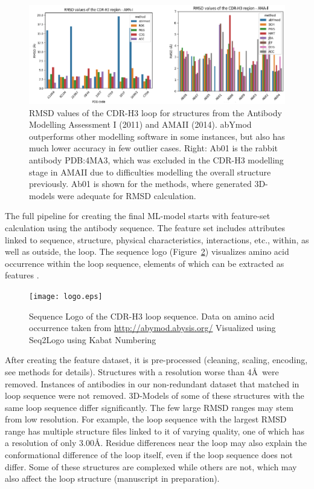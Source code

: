 \begin{figure}
  \centering
  \includegraphics[width=\linewidth]{AMA.eps}
  \caption {RMSD values of the CDR-H3 loop for structures from the
    Antibody Modelling Assessment I (2011) and AMAII (2014). abYmod
    outperforms other modelling software in some instances, but also
    has much lower accuracy in few outlier cases. 
    Right: Ab01 is the rabbit antibody PDB:4MA3, which was
    excluded in the CDR-H3 modelling stage in AMAII due to
    difficulties modelling the overall structure previously. Ab01 is
    shown for the methods, where generated 3D-models were adequate for
    RMSD calculation.}
  \label{fig:AMA}
\end{figure}

The full pipeline for creating the final ML-model
starts with 
feature-set calculation using the antibody sequence. The feature set
includes attributes linked to sequence, structure, physical
characteristics, interactions, etc., within, as well as outside, the
loop. 
The sequence logo (Figure~\ref{fig:logo}) visualizes amino acid
occurrence within the loop sequence, elements of which can be
extracted as features \cite{Thomsen2012,Shaner1993}.

\begin{figure}
  \centering
  \texttt{[image: logo.eps]}
  \caption {Sequence Logo of the CDR-H3 loop sequence. Data on amino
    acid occurrence taken from \protect\url{http://abymod.abysis.org/} Visualized
    using Seq2Logo using Kabat Numbering}
  \label{fig:logo}
\end{figure}

After creating the feature dataset, it is pre-processed (cleaning,
scaling, encoding, see methods for details). Structures with a
resolution worse than 4\AA\ were removed.
Instances of antibodies in our non-redundant dataset that matched in loop sequence were
not removed. 3D-Models of some of these structures with the same loop
sequence differ significantly. The few large RMSD ranges may stem from
low resolution. For example, the loop sequence with the largest RMSD range 
has multiple structure files linked to it of varying quality, one of which has a resolution of only 3.00\AA. Residue differences near the loop may also
explain the conformational difference of the loop itself, 
even if the loop sequence does not differ. Some of these structures are
complexed while others are not, which may also affect the loop
structure (manuscript in preparation).


